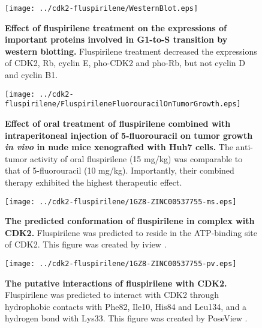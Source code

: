 \documentclass[10pt]{article}
\begin{document}
\begin{figure}
\begin{center}
\texttt{[image: ../cdk2-fluspirilene/WesternBlot.eps]}
\end{center}
\caption{
{\bf Effect of fluspirilene treatment on the expressions of important proteins involved in G1-to-S transition by western blotting.} Fluspirilene treatment decreased the expressions of CDK2, Rb, cyclin E, pho-CDK2 and pho-Rb, but not cyclin D and cyclin B1.
}
\label{WesternBlot}
\end{figure}

\begin{figure}
\begin{center}
\texttt{[image: ../cdk2-fluspirilene/FluspirileneFluorouracilOnTumorGrowth.eps]}
\end{center}
\caption{
{\bf Effect of oral treatment of fluspirilene combined with intraperitoneal injection of 5-fluorouracil on tumor growth \textit{in vivo} in nude mice xenografted with Huh7 cells.} The anti-tumor activity of oral fluspirilene (15 mg/kg) was comparable to that of 5-fluorouracil (10 mg/kg). Importantly, their combined therapy exhibited the highest therapeutic effect.
}
\label{FluspirileneFluorouracilOnTumorGrowth}
\end{figure}

\begin{figure}
\begin{center}
\texttt{[image: ../cdk2-fluspirilene/1GZ8-ZINC00537755-ms.eps]}
\end{center}
\caption{
{\bf The predicted conformation of fluspirilene in complex with CDK2.} Fluspirilene was predicted to reside in the ATP-binding site of CDK2. This figure was created by iview \cite{1366}.
}
\label{1GZ8-ZINC00537755-ms}
\end{figure}

\begin{figure}
\begin{center}
\texttt{[image: ../cdk2-fluspirilene/1GZ8-ZINC00537755-pv.eps]}
\end{center}
\caption{
{\bf The putative interactions of fluspirilene with CDK2.} Fluspirilene was predicted to interact with CDK2 through hydrophobic contacts with Phe82, Ile10, His84 and Leu134, and a hydrogen bond with Lys33. This figure was created by PoseView \cite{748}.
}
\label{1GZ8-ZINC00537755-pv}
\end{figure}
\end{document}
